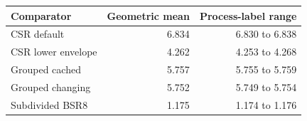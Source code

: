 \begin{tabular}{lrr}
\toprule
Comparator & Geometric mean & Process-label range \\
\midrule
CSR default & 6.834 & 6.830 to 6.838 \\
CSR lower envelope & 4.262 & 4.253 to 4.268 \\
Grouped cached & 5.757 & 5.755 to 5.759 \\
Grouped changing & 5.752 & 5.749 to 5.754 \\
Subdivided BSR8 & 1.175 & 1.174 to 1.176 \\
\bottomrule
\end{tabular}
